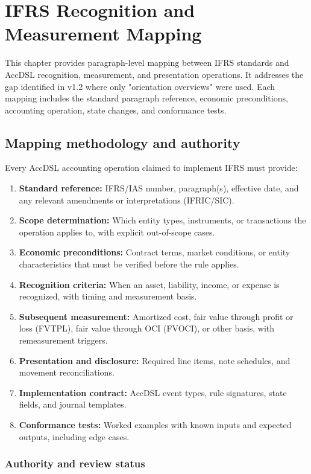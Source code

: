 \chapter{IFRS Recognition and Measurement Mapping}
\label{ch:ifrs}

This chapter provides paragraph-level mapping between IFRS standards and AccDSL
recognition, measurement, and presentation operations. It addresses the gap
identified in v1.2 where only "orientation overviews" were used. Each mapping
includes the standard paragraph reference, economic preconditions, accounting
operation, state changes, and conformance tests.

\section{Mapping methodology and authority}

Every AccDSL accounting operation claimed to implement IFRS must provide:

\begin{enumerate}
\item \textbf{Standard reference:} IFRS/IAS number, paragraph(s), effective date,
and any relevant amendments or interpretations (IFRIC/SIC).
\item \textbf{Scope determination:} Which entity types, instruments, or transactions
the operation applies to, with explicit out-of-scope cases.
\item \textbf{Economic preconditions:} Contract terms, market conditions, or
entity characteristics that must be verified before the rule applies.
\item \textbf{Recognition criteria:} When an asset, liability, income, or expense
is recognized, with timing and measurement basis.
\item \textbf{Subsequent measurement:} Amortized cost, fair value through profit
or loss (FVTPL), fair value through OCI (FVOCI), or other basis, with
remeasurement triggers.
\item \textbf{Presentation and disclosure:} Required line items, note schedules,
and movement reconciliations.
\item \textbf{Implementation contract:} AccDSL event types, rule signatures,
state fields, and journal templates.
\item \textbf{Conformance tests:} Worked examples with known inputs and expected
outputs, including edge cases.
\end{enumerate}

\subsection{Authority and review status}

